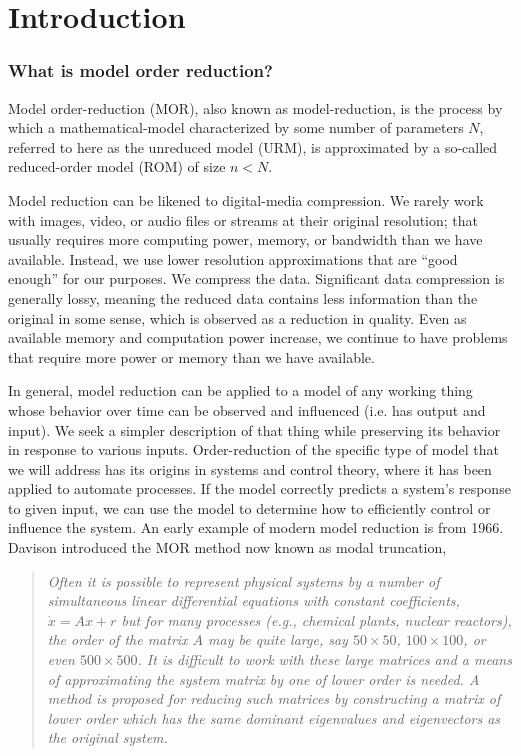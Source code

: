 
\chapter{Introduction}\label{sec:intro}
\subsection{What is model order reduction?}
Model order-reduction (MOR), also known as model-reduction, is the process by which a mathematical-model  characterized by some number of parameters $N$, referred to here as the unreduced model (URM), is approximated by a so-called reduced-order model (ROM) of size $n<N$.  


Model reduction can be likened to digital-media compression.  We rarely work with images, video, or audio files or streams at their original resolution;  that usually requires more computing power, memory, or bandwidth than we have available.    Instead, we use lower resolution approximations that are ``good enough'' for our purposes.  We compress the data.  Significant data compression is generally lossy, meaning the reduced data contains less information than the original in some sense, which is observed as a reduction in quality.   Even as available memory and computation power increase, we continue to have problems that require more power or memory than we have available.   

\smallskip
In general,  model reduction can be applied to a model of any working thing whose behavior over time can be observed and influenced (i.e. has output and input).   We seek a simpler description of that thing while preserving its behavior in response to various inputs.  Order-reduction of the specific type of model that we will address has its origins in systems and control theory, where it has been applied to automate processes.   If the model correctly predicts a system's response to given input, we can use the model to determine how to efficiently control or influence the system.  An early example of modern model reduction is \cite{modaltrunc} from 1966.  Davison introduced the MOR method now known as modal truncation,               
\begin{quotation}\singlespacing \itshape
Often it is possible to represent physical systems by a number
of simultaneous linear differential equations with constant coefficients,
$\dot{x}=Ax+r$ but for many processes (e.g., chemical plants, nuclear reactors), the
order of the matrix $A$ may be quite large, say $50\times50$, $100\times100$, or even $500\times500$. It is difficult to work with these large matrices and a means
of approximating the system matrix by one of lower order
is needed. A method is proposed for reducing such matrices by constructing a matrix of lower order which has the same dominant eigenvalues and
eigenvectors as the original system.
\end{quotation}

